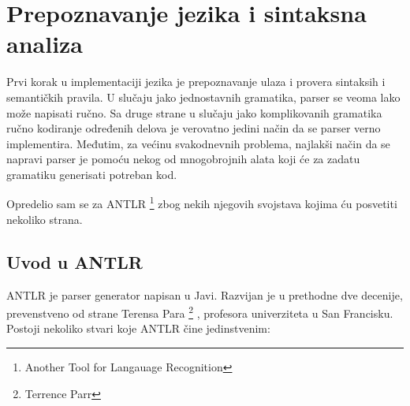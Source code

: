 \chapter{Prepoznavanje jezika i sintaksna analiza}

Prvi korak u implementaciji jezika je prepoznavanje ulaza i provera sintaksih i semantičkih pravila. 
U slučaju jako jednostavnih gramatika, parser se veoma lako može napisati ručno. 
Sa druge strane u slučaju jako komplikovanih gramatika ručno kodiranje određenih delova je verovatno jedini način da se parser verno implementira. 
Međutim, za većinu svakodnevnih problema, najlakši način da se napravi parser je pomoću nekog od mnogobrojnih alata koji će za zadatu gramatiku generisati potreban kod. 

Opredelio sam se za ANTLR
\footnote{\skr \eng Another Tool for Langauage Recognition} 
zbog nekih njegovih svojstava kojima ću posvetiti nekoliko strana.

\section{Uvod u ANTLR}

ANTLR je parser generator napisan u Javi. 
Razvijan je u prethodne dve decenije, prevenstveno od strane Terensa Para
\footnote{Terrence Parr}
, profesora univerziteta u San Francisku. Postoji nekoliko stvari koje ANTLR čine jedinstvenim\cite{antlr-contrib}:

